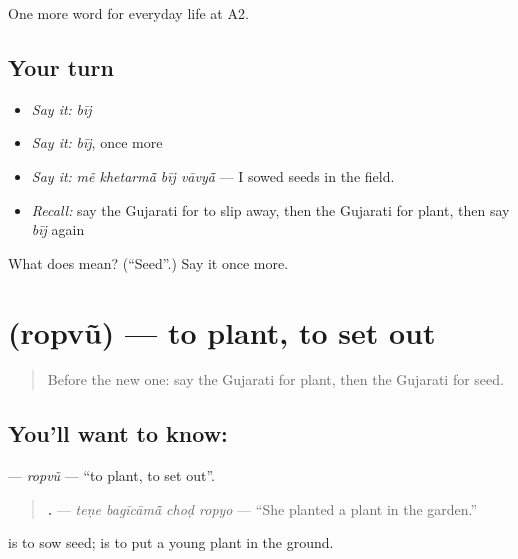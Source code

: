 \begin{grammarlens}[title={What you've built}]
One more word for everyday life at A2.
\end{grammarlens}

\subsection*{Your turn}
\begin{itemize}
\raggedright
  \item \emph{Say it:} \emph{bīj}
  \item \emph{Say it:} \emph{bīj}, once more
  \item \emph{Say it:} \emph{mẽ khetarmā̃ bīj vāvyā̃} — I sowed seeds in the field.
  \item \emph{Recall:} say the Gujarati for to slip away, then the Gujarati for plant, then say \emph{bīj} again
\end{itemize}

\begin{tcolorbox}[breakable,colback=teal!4,colframe=teal!35!black,title={Before you move on}]
What does  mean? (\textquotedblleft{}Seed\textquotedblright{}.) Say it once more.
\end{tcolorbox}
\section[\texorpdfstring{\gu{રોપવું} (ropvũ)}{રોપવું (ropvũ)}]{ (ropvũ) — to plant, to set out}

\label{lesson:GU-C240-ropvu}



\begin{quote}
Before the new one: say the Gujarati for plant, then the Gujarati for seed.
\end{quote}

\subsection*{You'll want to know: }
\textbf{} — \emph{ropvũ} — \textquotedblleft{}to plant, to set out\textquotedblright{}.

\begin{quote}
\textbf{   .} — \emph{teṇe bagīcāmā̃ choḍ ropyo} — \textquotedblleft{}She planted a plant in the garden.\textquotedblright{}
\end{quote}

\textbf{} is to sow seed; \textbf{} is to put a young plant in the ground.


